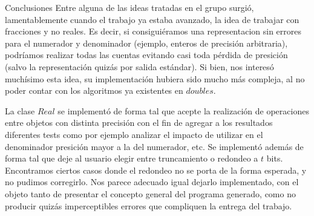 \begin{section}{Conclusiones}
	Entre alguna de las ideas tratadas en el grupo surgió, lamentablemente cuando el trabajo ya estaba avanzado, la idea de trabajar con fracciones y no reales. Es decir, si consiguiéramos una representacion sin errores para el numerador y denominador (ejemplo, enteros de precisión arbitraria), podríamos realizar todas las cuentas evitando casi toda pérdida de presición (salvo la representación quizás por salida estándar). Si bien, nos interesó muchísimo esta idea, su implementación hubiera sido mucho más compleja, al no poder contar con los algoritmos ya existentes en $doubles$.
	
	La clase $Real$ se implementó de forma tal que acepte la realización de operaciones entre objetos con distinta precisión con el fin de agregar a los resultados diferentes tests como por ejemplo analizar el impacto de utilizar en el denominador presición mayor a la del numerador, etc. Se implementó además de forma tal que deje al usuario elegir entre truncamiento o redondeo a $t$ bits. Encontramos ciertos casos donde el redondeo no se porta de la forma esperada, y no pudimos corregirlo. Nos parece adecuado igual dejarlo implementado, con el objeto tanto de presentar el concepto general del programa generado, como no producir quizás imperceptibles errores que compliquen la entrega del trabajo. 

\end{section}
